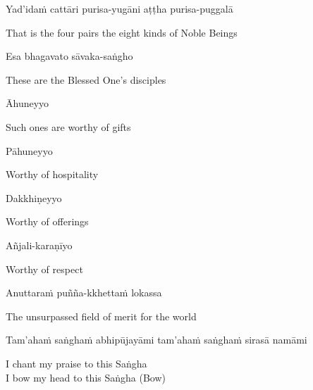Yad'idaṁ cattāri purisa-yugāni aṭṭha purisa-puggalā

\begin{english}
  That is the four pairs the eight kinds of Noble Beings
\end{english}

Esa bhagavato sāvaka-saṅgho

\begin{english}
  These are the Blessed One's disciples
\end{english}

Āhuneyyo

\begin{english}
  Such ones are worthy of gifts
\end{english}

Pāhuneyyo

\begin{english}
  Worthy of hospitality
\end{english}

\ifasixversion\clearpage\fi

Dakkhiṇeyyo

\begin{english}
  Worthy of offerings
\end{english}

Añjali-karaṇīyo

\begin{english}
  Worthy of respect
\end{english}

Anuttaraṁ puñña-kkhettaṁ lokassa

\begin{english}
  The unsurpassed field of merit for the world\ifdigitalversion\makeatletter\hyperlink{endnote149-appendix}\makeatother\fi
\end{english}

\suttaRef{[SN 12.41]}

\begin{pali-hang}
  Tam'ahaṁ saṅghaṁ abhipūjayāmi tam'ahaṁ saṅghaṁ sirasā namāmi
\end{pali-hang}

\begin{english}
  I chant my praise to this Saṅgha\\
  I bow my head to this Saṅgha \hfill{\textnormal{\ifafiveversion\fontsize{12.5}{18}\fi\ifasixversion\fontsize{9}{13}\fi\selectfont (Bow)}}
\end{english}

